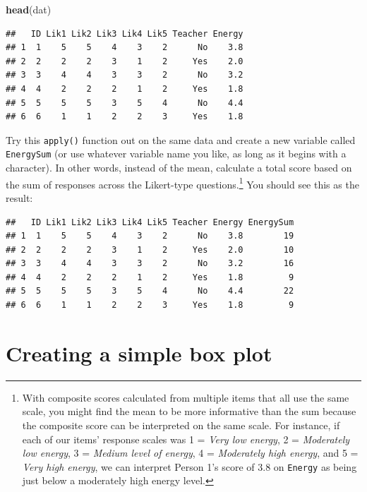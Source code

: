 \documentclass[
]{book}
\newenvironment{Shaded}{\begin{snugshade}}{\end{snugshade}}
\newcommand{\KeywordTok}[1]{\textcolor[rgb]{0.13,0.29,0.53}{\textbf{#1}}}
\newcommand{\NormalTok}[1]{#1}
\begin{document}
\begin{Shaded}
\begin{Highlighting}[]
\KeywordTok{head}\NormalTok{(dat)}
\end{Highlighting}
\end{Shaded}

\begin{verbatim}
##   ID Lik1 Lik2 Lik3 Lik4 Lik5 Teacher Energy
## 1  1    5    5    4    3    2      No    3.8
## 2  2    2    2    3    1    2     Yes    2.0
## 3  3    4    4    3    3    2      No    3.2
## 4  4    2    2    2    1    2     Yes    1.8
## 5  5    5    5    3    5    4      No    4.4
## 6  6    1    1    2    2    3     Yes    1.8
\end{verbatim}

Try this \texttt{apply()} function out on the same data and create a new variable called \texttt{EnergySum} (or use whatever variable name you like, as long as it begins with a character). In other words, instead of the mean, calculate a total score based on the sum of responses across the Likert-type questions.\footnote{With composite scores calculated from multiple items that all use the same scale, you might find the mean to be more informative than the sum because the composite score can be interpreted on the same scale.
  For instance, if each of our items' response scales was 1 = \emph{Very low energy}, 2 = \emph{Moderately low energy}, 3 = \emph{Medium level of energy}, 4 = \emph{Moderately high energy}, and 5 = \emph{Very high energy}, we can interpret Person 1's score of 3.8 on \texttt{Energy} as being just below a moderately high energy level.} You should see this as the result:

\begin{verbatim}
##   ID Lik1 Lik2 Lik3 Lik4 Lik5 Teacher Energy EnergySum
## 1  1    5    5    4    3    2      No    3.8        19
## 2  2    2    2    3    1    2     Yes    2.0        10
## 3  3    4    4    3    3    2      No    3.2        16
## 4  4    2    2    2    1    2     Yes    1.8         9
## 5  5    5    5    3    5    4      No    4.4        22
## 6  6    1    1    2    2    3     Yes    1.8         9
\end{verbatim}

\hypertarget{plotting}{%
\chapter{Creating a simple box plot}\label{plotting}}
\end{document}
